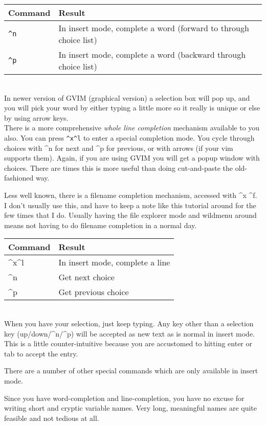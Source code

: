 \documentclass[a4paper, 12pt]{article}
\begin{document}
\begin{tabular}{ l | p{8cm} }
  \textbf{Command} & \textbf{Result}\\ \hline
  \texttt{\^{}n} & In insert mode, complete a word (forward to through choice list)\\
  \texttt{\^{}p} & In insert mode, complete a word (backward through choice list)\\ \hline
\end{tabular}\\

In newer version of GVIM (graphical version) a selection box will pop up, and you will pick your word by either typing a little more so it really is unique or else by using arrow keys.\\
There is a more comprehensive \textit{whole line completion} mechanism available to you also. You can press \texttt{\^{}x\^{}l} to enter a special completion mode. You cycle through choices with ^n for next and ^p for previous, or with arrows (if your vim supports them). Again, if you are using GVIM you will get a popup window with choices. There are times this is more useful than doing cut-and-paste the old-fashioned way.

Less well known, there is a filename completion mechanism, accessed with ^x ^f. I don't usually use this, and have to keep a note like this tutorial around for the few times that I do. Usually having the file explorer mode and wildmenu around means not having to do filename completion in a normal day.

\begin{tabular}{ l | p{8cm} }
  \textbf{Command} & \textbf{Result}\\ \hline
      ^x^l  & In insert mode, complete a line\\ \hline
      ^n	& Get next choice\\
      ^p	& Get previous choice\\ \hline
\end{tabular}\\

When you have your selection, just keep typing. Any key other than a selection key (up/down/^n/^p) will be accepted as new text as is normal in insert mode. This is a little counter-intuitive because you are accustomed to hitting enter or tab to accept the entry.

There are a number of other special commands which are only available in insert mode.

Since you have word-completion and line-completion, you have no excuse for writing short and cryptic variable names. Very long, meaningful names are quite feasible and not tedious at all.
\end{document}
